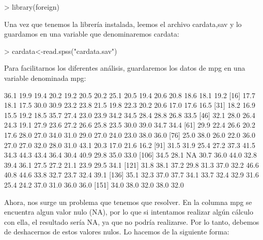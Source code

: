 \documentclass [a4paper] {article}
\begin{document}
\begin{Schunk}
\begin{Sinput}
> library(foreign)
\end{Sinput}
\end{Schunk}

Una vez que tenemos la librería instalada, leemos el archivo cardata,sav y lo guardamos en una variable que
denominaremos cardata:

\begin{Schunk}
\begin{Sinput}
> cardata<-read.spss("cardata.sav")
\end{Sinput}
\end{Schunk}

Para facilitarnos los diferentes análisis, guardaremos los datos de mpg en una variable denominada mpg:

\begin{Schunk}
\begin{Soutput}
  [1] 36.1 19.9 19.4 20.2 19.2 20.5 20.2 25.1 20.5 19.4 20.6 20.8 18.6 18.1 19.2
 [16] 17.7 18.1 17.5 30.0 30.9 23.2 23.8 21.5 19.8 22.3 20.2 20.6 17.0 17.6 16.5
 [31] 18.2 16.9 15.5 19.2 18.5 35.7 27.4 23.0 23.9 34.2 34.5 28.4 28.8 26.8 33.5
 [46] 32.1 28.0 26.4 24.3 19.1 27.9 23.6 27.2 26.6 25.8 23.5 30.0 39.0 34.7 34.4
 [61] 29.9 22.4 26.6 20.2 17.6 28.0 27.0 34.0 31.0 29.0 27.0 24.0 23.0 38.0 36.0
 [76] 25.0 38.0 26.0 22.0 36.0 27.0 27.0 32.0 28.0 31.0 43.1 20.3 17.0 21.6 16.2
 [91] 31.5 31.9 25.4 27.2 37.3 41.5 34.3 44.3 43.4 36.4 30.4 40.9 29.8 35.0 33.0
[106] 34.5 28.1   NA 30.7 36.0 44.0 32.8 39.4 36.1 27.5 27.2 21.1 23.9 29.5 34.1
[121] 31.8 38.1 37.2 29.8 31.3 37.0 32.2 46.6 40.8 44.6 33.8 32.7 23.7 32.4 39.1
[136] 35.1 32.3 37.0 37.7 34.1 33.7 32.4 32.9 31.6 25.4 24.2 37.0 31.0 36.0 36.0
[151] 34.0 38.0 32.0 38.0 32.0
\end{Soutput}
\end{Schunk}

Ahora, nos surge un problema que tenemos que resolver. En la columna mpg se encuentra algun valor nulo (NA), por
lo que si intentamos realizar algún cálculo con ella, el resultado sería NA, ya que no podría realizarse. 
Por lo tanto, debemos de deshacernos de estos valores nulos. Lo hacemos de la siguiente forma:
\end{document}
